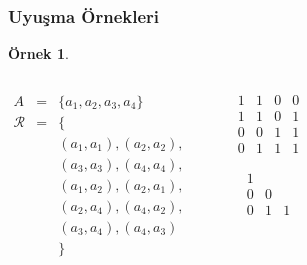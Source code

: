\documentclass[dvipsnames]{beamer}
\theoremstyle{definition}
\theoremstyle{example}
\newtheorem{ornek}[theorem]{Örnek}
\theoremstyle{plain}
\begin{document}
\begin{frame}
  \frametitle{Uyuşma Örnekleri}

  \begin{ornek}
    \begin{columns}
      \begin{eqnarray*}
        A           & = & \{a_1,a_2,a_3,a_4\}\\
        \mathcal{R} & = & \{\\
                    &   & (a_1,a_1),(a_2,a_2),\\
                    &   & (a_3,a_3),(a_4,a_4),\\
                    &   & (a_1,a_2),(a_2,a_1),\\
                    &   & (a_2,a_4),(a_4,a_2),\\
                    &   & (a_3,a_4),(a_4,a_3)\\
                    &   & \}
      \end{eqnarray*}

      \begin{center}

        \bigskip
      \end{center}

      \pause
      \begin{center}
        \[
          \begin{array}{|cccc|}
            1  &  1  &  0  &  0\\
            1  &  1  &  0  &  1\\
            0  &  0  &  1  &  1\\
            0  &  1  &  1  &  1
          \end{array}
        \]

        \[
          \begin{array}{|ccc|}
            1  &     & \\
            0  &  0  & \\
            0  &  1  &  1
          \end{array}
        \]
      \end{center}
    \end{columns}
  \end{ornek}
\end{frame}
\end{document}
